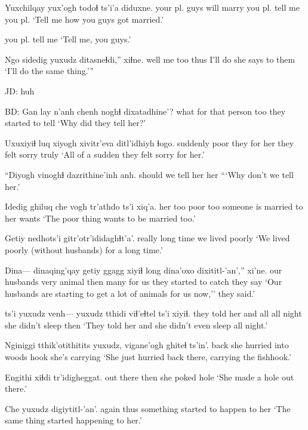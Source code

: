\documentclass[12pt]{article}
\begin{document}
\gll Yuxchilqay {yux'ogh todoɬ} ts'i'a diduxne.
{your pl. guys} {will marry you pl.} {} {tell me you pl.}
\glt `Tell me how you guys got married.'
\glend

{{you pl. tell me}}
\glt `Tell me, you guys.'
\glend

\gll Ngo sidedig yuxudz ditasneɬdi,'' xiɬne.
well {me too} thus {I'll do} {she says to them}
\glt `I'll do the same thing.'''
\glend

JD:  huh

BD:  
\gll Gan lay n'anh chenh {noghɬ dixatadhine'}?
what for {that person} too   {they started to tell}
\glt `Why did they tell her?'
\glend

\gll Uxuxiyiɬ luq xiyogh {xivitr'eva ditl'idhiyh} ɬogo.
suddenly poor {they for her} {they felt sorry} truly
\glt `All of a sudden they felt sorry for her.'
\glend

\gll ``Diyogh {vinoghɬ dazrithine'inh} anh.
should  {we tell her} her
\glt ```Why don't we tell her.'
\glend

\gll Idedig ghiluq che {vogh tr'athdo} ts'i xiq'a.
{her too} poor too {someone is married to her} {} wants
\glt `The poor thing wants to be married too.'
\glend

\gll Getiy nedhots'i gitr'otr'ididaghɬt'a'.
really {long time} {we lived poorly}
\glt `We lived poorly (without husbands) for a long time.'
\glend

\gll Dina--- dinaqing'qay getiy ggagg xiyiɬ long dina'oxo dixititl-'an','' xi'ne.
{} {our husbands} very animal then many {for us} {they started to catch} {they say}
\glt `Our husbands are starting to get a lot of animals for us now,'' they said.'
\glend

 ts'i yuxudz venh--- yuxudz tthidi {viɬ'eɬtel ts'i} xiyiɬ.
{they told her} and all {} all night {she didn't sleep} then
\glt `They told her and she didn't even sleep all night.'
\glend

\gll Nginiggi tthik'otithitits yuxudz, vigane'ogh ghiteɬ ts'in'.
back {she hurried into woods} {} hook {she's carrying}
\glt `She just hurried back there, carrying the fishhook.'
\glend

\gll Engithi xiɬdi tr'idigheggat.
{out there} then {she poked hole}
\glt `She made a hole out there.'
\glend

\gll Che yuxudz digiytitl-'an'.
again thus {something started to happen to her}
\glt `The same thing started happening to her.'
\glend
\end{document}
